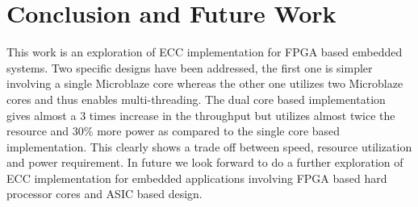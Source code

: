 \documentclass[preprint,12pt]{elsarticle}
\begin{document}
\section{Conclusion and Future Work}
This work is an exploration of ECC implementation for FPGA based embedded systems. Two specific designs have been addressed, the first one is simpler involving a single Microblaze core whereas the other one utilizes two Microblaze cores and thus enables multi-threading. The dual core based implementation gives almost a 3 times increase in the throughput but utilizes almost twice the resource and 30\% more power as compared to the single core based implementation. This clearly shows a trade off between speed, resource utilization and power requirement. In future we look forward to do a further exploration of ECC implementation for embedded applications involving FPGA based hard processor cores and ASIC based design. 
\vspace{-10pt}
\end{document}
